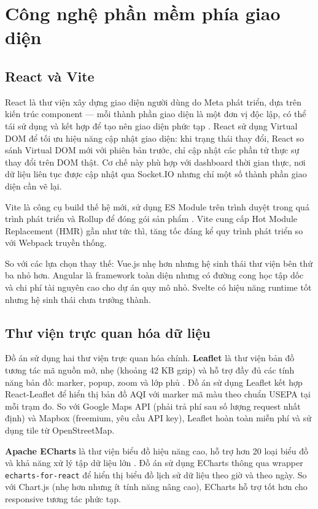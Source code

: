 \documentclass[../DoAn.tex]{subfiles}
\begin{document}
\section{Công nghệ phần mềm phía giao diện}
\label{section:3.5}

\subsection{React và Vite}
\label{subsection:3.5.1}

React là thư viện xây dựng giao diện người dùng do Meta phát triển, dựa trên kiến trúc component — mỗi thành phần giao diện là một đơn vị độc lập, có thể tái sử dụng và kết hợp để tạo nên giao diện phức tạp \cite{react2024}. React sử dụng Virtual DOM để tối ưu hiệu năng cập nhật giao diện: khi trạng thái thay đổi, React so sánh Virtual DOM mới với phiên bản trước, chỉ cập nhật các phần tử thực sự thay đổi trên DOM thật. Cơ chế này phù hợp với dashboard thời gian thực, nơi dữ liệu liên tục được cập nhật qua Socket.IO nhưng chỉ một số thành phần giao diện cần vẽ lại.

Vite là công cụ build thế hệ mới, sử dụng ES Module trên trình duyệt trong quá trình phát triển và Rollup để đóng gói sản phẩm \cite{vite2024}. Vite cung cấp Hot Module Replacement (HMR) gần như tức thì, tăng tốc đáng kể quy trình phát triển so với Webpack truyền thống.

So với các lựa chọn thay thế: Vue.js nhẹ hơn nhưng hệ sinh thái thư viện bên thứ ba nhỏ hơn. Angular là framework toàn diện nhưng có đường cong học tập dốc và chi phí tài nguyên cao cho dự án quy mô nhỏ. Svelte có hiệu năng runtime tốt nhưng hệ sinh thái chưa trưởng thành.

\subsection{Thư viện trực quan hóa dữ liệu}
\label{subsection:3.5.2}

Đồ án sử dụng hai thư viện trực quan hóa chính. \textbf{Leaflet} là thư viện bản đồ tương tác mã nguồn mở, nhẹ (khoảng 42 KB gzip) và hỗ trợ đầy đủ các tính năng bản đồ: marker, popup, zoom và lớp phủ \cite{leaflet2024}. Đồ án sử dụng Leaflet kết hợp React-Leaflet để hiển thị bản đồ \gls{AQI} với marker mã màu theo chuẩn \gls{USEPA} tại mỗi trạm đo. So với Google Maps API (phải trả phí sau số lượng request nhất định) và Mapbox (freemium, yêu cầu API key), Leaflet hoàn toàn miễn phí và sử dụng tile từ OpenStreetMap.

\textbf{Apache ECharts} là thư viện biểu đồ hiệu năng cao, hỗ trợ hơn 20 loại biểu đồ và khả năng xử lý tập dữ liệu lớn \cite{echarts2024}. Đồ án sử dụng ECharts thông qua wrapper \texttt{echarts-for-react} để hiển thị biểu đồ lịch sử dữ liệu theo giờ và theo ngày. So với Chart.js (nhẹ hơn nhưng ít tính năng nâng cao), ECharts hỗ trợ tốt hơn cho responsive tương tác phức tạp.
\end{document}
